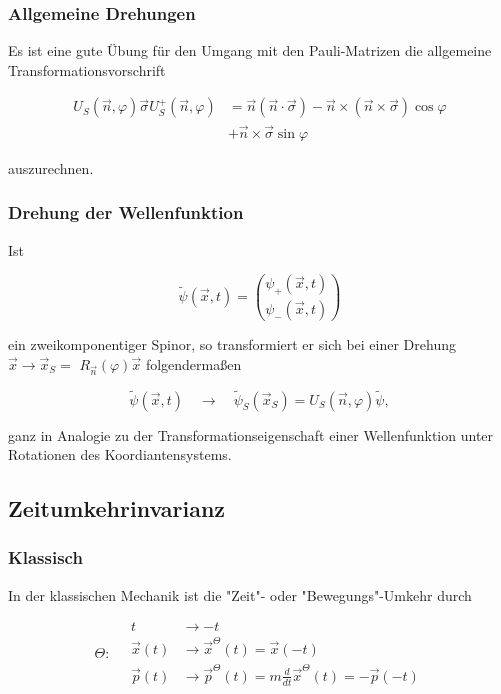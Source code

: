 \documentclass[10pt, letterpaper]{article}
\begin{document}
\subsubsection*{Allgemeine Drehungen}
Es ist eine gute Übung für den Umgang mit den Pauli-Matrizen die allgemeine Transformationsvorschrift

$$
\begin{aligned}
U_{S}(\vec{n}, \varphi) \vec{\sigma} U_{S}^{+}(\vec{n}, \varphi) & =\vec{n}(\vec{n} \cdot \vec{\sigma})-\vec{n} \times(\vec{n} \times \vec{\sigma}) \cos \varphi \\
& +\vec{n} \times \vec{\sigma} \sin \varphi
\end{aligned}
$$

auszurechnen.

\subsubsection*{Drehung der Wellenfunktion}
Ist

$$
\widetilde{\psi}(\vec{x}, t)=\binom{\psi_{+}(\vec{x}, t)}{\psi_{-}(\vec{x}, t)}
$$

ein zweikomponentiger Spinor, so transformiert er sich bei einer Drehung $\vec{x} \rightarrow \vec{x}_{S}=$ $R_{\vec{n}}(\varphi) \vec{x}$ folgendermaßen

$$
\tilde{\psi}(\vec{x}, t) \quad \rightarrow \quad \tilde{\psi}_{S}\left(\vec{x}_{S}\right)=U_{S}(\vec{n}, \varphi) \tilde{\psi},
$$

ganz in Analogie zu der Transformationseigenschaft einer Wellenfunktion unter Rotationen des Koordiantensystems.








\subsection*{Zeitumkehrinvarianz}
\subsubsection*{Klassisch}
In der klassischen Mechanik ist die "Zeit"- oder "Bewegungs"-Umkehr durch

$$
\Theta: \quad \begin{aligned}
t & \rightarrow-t \\
\vec{x}(t) & \rightarrow \vec{x}^{\Theta}(t)=\vec{x}(-t) \\
\vec{p}(t) & \rightarrow \vec{p}^{\Theta}(t)=m \frac{d}{d t} \vec{x}^{\Theta}(t)=-\vec{p}(-t)
\end{aligned}
$$
\end{document}
